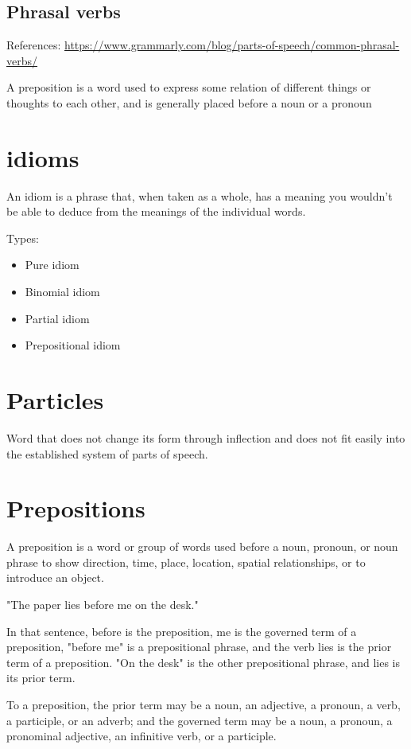 \documentclass{book}
\begin{document}
\section{Phrasal verbs}

References:
\url{https://www.grammarly.com/blog/parts-of-speech/common-phrasal-verbs/}

A preposition is a word used to express some relation of different things or thoughts to each other, and is generally placed before a noun or a pronoun

\chapter{idioms}

An idiom is a phrase that, when taken as a whole, has a meaning you wouldn’t be able to deduce from the meanings of the individual words.

Types:
\begin{itemize}
	\item Pure idiom
	\item Binomial idiom
	\item Partial idiom
	\item Prepositional idiom
\end{itemize}

\chapter{Particles}

Word that does not change its form through inflection and does not fit easily into the established system of parts of speech.

\chapter{Prepositions}

A preposition is a word or group of words used before a noun, pronoun, or noun phrase to show direction, time, place, location, spatial relationships, or to introduce an object.

"The paper lies before me on the desk."

In that sentence, before is the preposition, me is the governed term of a preposition, "before me" is a prepositional phrase, and the verb lies is the prior term of a preposition. "On the desk" is the other prepositional phrase, and lies is its prior term.

To a preposition, the prior term may be a noun, an adjective, a pronoun, a verb, a participle, or an adverb; and the governed term may be a noun, a pronoun, a pronominal adjective, an infinitive verb, or a participle. 
\end{document}
